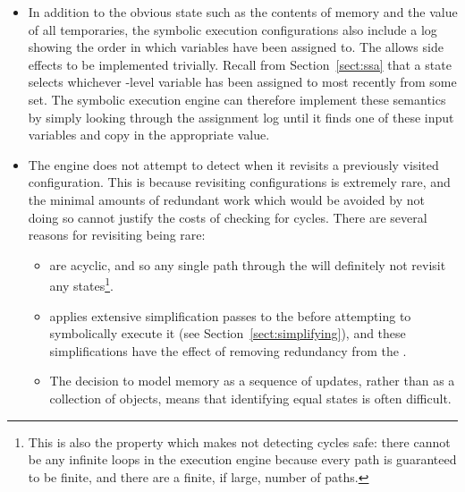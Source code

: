 \begin{itemize}

\item In addition to the obvious state such as the contents of memory
  and the value of all {\StateMachine} temporaries, the symbolic
  execution configurations also include a log showing the order in
  which variables have been assigned to.  The allows \state{$\Phi$}
  side effects to be implemented trivially.  Recall from
  Section~\ref{sect:ssa} that a {\technique} \state{$\Phi$} state
  selects whichever {\StateMachine}-level variable has been assigned
  to most recently from some set.  The symbolic execution engine can
  therefore implement these semantics by simply looking through the
  assignment log until it finds one of these input variables and copy
  in the appropriate value.


\item The engine does not attempt to detect when it revisits a
  previously visited configuration.  This is because revisiting
  configurations is extremely rare, and the minimal amounts of
  redundant work which would be avoided by not doing so cannot justify
  the costs of checking for cycles.  There are several reasons for
  revisiting being rare:

  \begin{itemize}
  \item {\STateMachines} are acyclic, and so any single path through
    the {\StateMachine} will definitely not revisit any
    states\footnote{This is also the property which makes not
      detecting cycles safe: there cannot be any infinite loops in the
      execution engine because every path is guaranteed to be finite,
      and there are a finite, if large, number of paths.}.
  \item {\Technique} applies extensive simplification passes to the
    {\StateMachine} before attempting to symbolically execute it (see
    Section~\ref{sect:simplifying}), and these simplifications have
    the effect of removing redundancy from the {\StateMachines}.
  \item The decision to model memory as a sequence of updates, rather
    than as a collection of objects, means that identifying equal
    states is often difficult.  
  \end{itemize}
\end{itemize}

